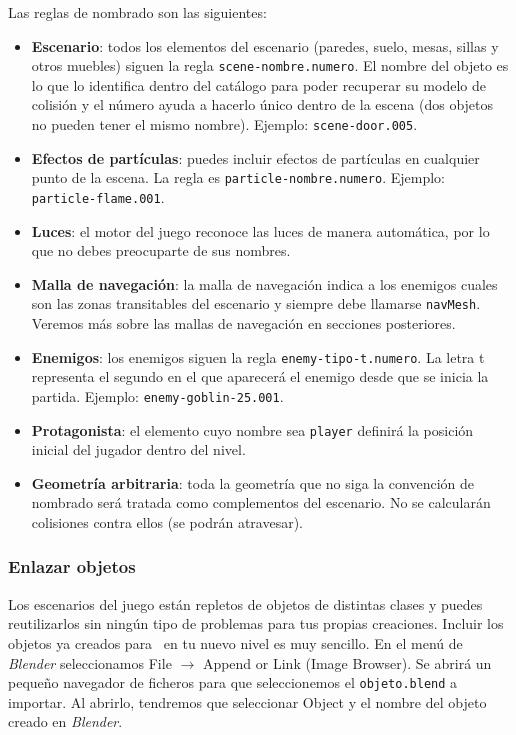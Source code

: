 Las reglas de nombrado son las siguientes:

\begin{itemize}
    \itemsep0em
    \item \textbf{Escenario}: todos los elementos del escenario (paredes,
    suelo, mesas, sillas y otros muebles) siguen la regla \texttt{scene-nombre.numero}.
    El nombre del objeto es lo que lo identifica dentro del catálogo para poder
    recuperar su modelo de colisión y el número ayuda a hacerlo único dentro de la
    escena (dos objetos no pueden tener el mismo nombre). Ejemplo: \texttt{scene-door.005}.
    \item \textbf{Efectos de partículas}: puedes incluir efectos de partículas
    en cualquier punto de la escena. La regla es \texttt{particle-nombre.numero}.
    Ejemplo: \texttt{particle-flame.001}.
    \item \textbf{Luces}: el motor del juego reconoce las luces de manera automática,
    por lo que no debes preocuparte de sus nombres.
    \item \textbf{Malla de navegación}: la malla de navegación indica a los
    enemigos cuales son las zonas transitables del escenario y siempre
    debe llamarse \texttt{navMesh}. Veremos más sobre las mallas de navegación
    en secciones posteriores.
    \item \textbf{Enemigos}: los enemigos siguen la regla \texttt{enemy-tipo-t.numero}.
    La letra t representa el segundo en el que aparecerá el enemigo desde
    que se inicia la partida. Ejemplo: \texttt{enemy-goblin-25.001}.
    \item \textbf{Protagonista}: el elemento cuyo nombre sea \texttt{player}
    definirá la posición inicial del jugador dentro del nivel.
    \item \textbf{Geometría arbitraria}: toda la geometría que no siga
    la convención de nombrado será tratada como complementos del escenario.
    No se calcularán colisiones contra ellos (se podrán atravesar).
\end{itemize}

\subsubsection*{Enlazar objetos}

Los escenarios del juego están repletos de objetos de distintas clases
y puedes reutilizarlos sin ningún tipo de problemas para tus propias creaciones.
Incluir los objetos ya creados para \juego\ en tu nuevo nivel es muy sencillo.
En el menú de \textit{Blender} seleccionamos File $\rightarrow$ Append or
Link (Image Browser). Se abrirá un pequeño navegador de ficheros para
que seleccionemos el \texttt{objeto.blend} a importar. Al abrirlo, tendremos
que seleccionar Object y el nombre del objeto creado en \textit{Blender}.

